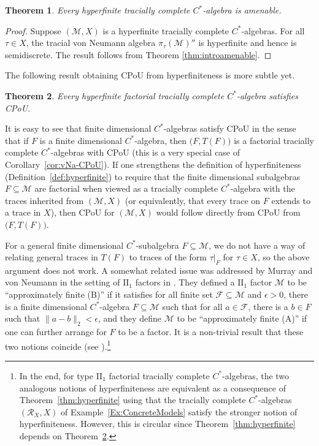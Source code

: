 \documentclass[a4paper,11pt]{amsart}
\newtheorem{theorem}{Theorem}
\theoremstyle{definition}
\numberwithin{equation}{section}
\numberwithin{theorem}{section}
\newcommand{\M}{\mathcal{M}}
\begin{document}
	
	\begin{theorem}\label{thm:hyperfinite-implies-semidiscrete}
		Every hyperfinite tracially complete $C^*$-algebra is {}amenable.
	\end{theorem}
	
	\begin{proof}
		Suppose $(\M, X)$ is a hyperfinite tracially complete $C^*$-algebras.  For all $\tau \in X$, the tracial von Neumann algebra $\pi_\tau(\M)''$ is hyperfinite and hence is semidiscrete.  The result follows from Theorem \ref{thm:introamenable}.
	\end{proof}
	
	The following result obtaining CPoU from hyperfiniteness is more subtle yet.  
	
	\begin{theorem}\label{thm:hyperfinite-implies-CPoU}
		Every hyperfinite factorial tracially complete $C^*$-algebra satisfies CPoU.
	\end{theorem}
	
	It is easy to see that finite dimensional $C^*$-algebras satisfy CPoU in the sense that if $F$ is a finite dimensional $C^*$-algebra, then $\big(F, T(F)\big)$ is a factorial tracially complete $C^*$-algebras with CPoU (this is a very special case of Corollary~\ref{cor:vNa-CPoU}).  If one strengthens the definition of hyperfiniteness (Definition~\ref{def:hyperfinite}) to require that the finite dimensional subalgebras $F \subseteq \mathcal M$ are factorial when viewed as a tracially complete $C^*$-algebra with the traces inherited from $(\mathcal M, X)$ (or equivalently, that every trace on $F$ extends to a trace in $X$), then CPoU for $(\mathcal M, X)$ would follow directly from CPoU from $\big(F, T(F)\big)$.
	
	For a general finite dimensional $C^*$-subalgebra $F \subseteq \mathcal M$, we do not have a way of relating general traces in $T(F)$ to traces of the form $\tau|_F$ for $\tau \in X$, so the above argument does not work.  A somewhat related issue was addressed by Murray and von Neumann in the setting of $\mathrm{II}_1$ factors in \cite{MvN43}.  They defined a $\mathrm{II}_1$ factor $\mathcal M$ to be ``approximately finite (B)'' if it satisfies for all finite set $\mathcal F \subseteq \mathcal M$ and $\epsilon > 0$, there is a finite dimensional $C^*$-algebra $F \subseteq \mathcal M$ such that for all $a \in \mathcal F$, there is a $b \in F$ such that $\|a - b\|_2 < \epsilon$, and they define $\mathcal M$ to be ``approximately finite (A)'' if one can further arrange for $F$ to be a factor.  It is a non-trivial result that these two notions coincide (see \cite[Lemma~4.6.2]{MvN43}).\footnote{In the end, for type II$_1$ factorial tracially complete $C^*$-algebras, the two analogous notions of hyperfiniteness are equivalent as a consequence of Theorem~\ref{thm:hyperfinite} using that the tracially complete $C^*$-algebras $(\mathcal R_X, X)$ of Example~\ref{Ex:ConcreteModels} satisfy the stronger notion of hyperfiniteness.  However, this is circular since Theorem~\ref{thm:hyperfinite} depends on Theorem~\ref{thm:hyperfinite-implies-CPoU}.}
	
\end{document}
